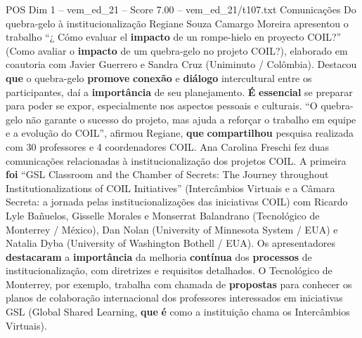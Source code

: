 \begin{textsample}{POS Dim 1 – vem\_ed\_21 – Score 7.00 – vem\_ed\_21/t107.txt}  \label{ex:f1_pos_167}
Comunicações Do quebra-gelo à institucionalização Regiane Souza Camargo Moreira apresentou o trabalho “¿ Cómo evaluar el \textbf{impacto} de un rompe-hielo en proyecto COIL?” (Como avaliar o \textbf{impacto} de um quebra-gelo no projeto COIL?), elaborado em coautoria com Javier Guerrero e Sandra Cruz (Uniminuto / Colômbia).
Destacou \textbf{que} o quebra-gelo \textbf{promove} \textbf{conexão} e \textbf{diálogo} intercultural entre os participantes, daí a \textbf{importância} de seu planejamento. \textbf{É} \textbf{essencial} se preparar para poder se expor, especialmente nos aspectos pessoais e culturais. “O quebra-gelo não garante o sucesso do projeto, mas ajuda a reforçar o trabalho em equipe e a evolução do COIL”, afirmou Regiane, \textbf{que} \textbf{compartilhou} pesquisa realizada com 30 professores e 4 coordenadores COIL.
Ana Carolina Freschi fez duas comunicações relacionadas à institucionalização dos projetos COIL.
A primeira \textbf{foi} “GSL Classroom and the Chamber of Secrets: The Journey throughout Institutionalizations of COIL Initiatives” (Intercâmbios Virtuais e a Câmara Secreta: a jornada pelas institucionalizações das iniciativas COIL) com Ricardo Lyle Bañuelos, Gisselle Morales e Monserrat Balandrano (Tecnológico de Monterrey / México), Dan Nolan (University of Minnesota System / EUA) e Natalia Dyba (University of Washington Bothell / EUA).
Os apresentadores \textbf{destacaram} a \textbf{importância} da melhoria \textbf{contínua} dos \textbf{processos} de institucionalização, com diretrizes e requisitos detalhados.
O Tecnológico de Monterrey, por exemplo, trabalha com chamada de \textbf{propostas} para conhecer os planos de colaboração internacional dos professores interessados em iniciativas GSL (Global Shared Learning, \textbf{que} \textbf{é} como a instituição chama os Intercâmbios Virtuais).

\end{textsample}
